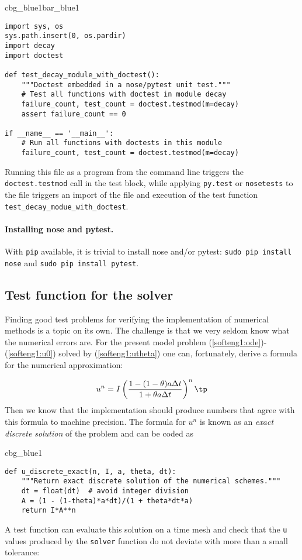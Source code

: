 \documentclass[graybox,sectrefs,envcountresetchap,open=right,final]{svmonodo}
\newenvironment{_cod_tight}[1]{
   \def\FrameCommand{\colorbox{#1}}
   \FrameRule0.6pt\MakeFramed {\FrameRestore}\vskip3mm}
   {\vskip0mm\endMakeFramed}
\newenvironment{cod}[1]{
\bgroup\rmfamily
\fboxsep=0mm\relax
\begin{_cod_tight}{#1}
\list{}{\parsep=-2mm\parskip=0mm\topsep=0pt\leftmargin=2mm
\rightmargin=2\leftmargin\leftmargin=4pt\relax}
\item\relax}
{\endlist\end{_cod_tight}\egroup}
\newenvironment{_pro_tight}[2]{
   \def\FrameCommand{\color{#2}\vrule width 1mm\normalcolor\colorbox{#1}}
   \FrameRule0.6pt\MakeFramed {\advance\hsize-2mm\FrameRestore}\vskip3mm}
   {\vskip0mm\endMakeFramed}
\newenvironment{pro}[2]{
\bgroup\rmfamily
\fboxsep=0mm\relax
\begin{_pro_tight}{#1}{#2}
\list{}{\parsep=-2mm\parskip=0mm\topsep=0pt\leftmargin=2mm
\rightmargin=2\leftmargin\leftmargin=4pt\relax}
\item\relax}
{\endlist\end{_pro_tight}\egroup}
\begin{document}
\begin{pro}{cbg_blue1}{bar_blue1}\begin{Verbatim}[numbers=none,fontsize=\fontsize{9pt}{9pt},baselinestretch=0.95,xleftmargin=2mm]
import sys, os
sys.path.insert(0, os.pardir)
import decay
import doctest

def test_decay_module_with_doctest():
    """Doctest embedded in a nose/pytest unit test."""
    # Test all functions with doctest in module decay
    failure_count, test_count = doctest.testmod(m=decay)
    assert failure_count == 0

if __name__ == '__main__':
    # Run all functions with doctests in this module
    failure_count, test_count = doctest.testmod(m=decay)
\end{Verbatim}
\end{pro}
\noindent
Running this file as a program from the command line
triggers the \texttt{doctest.testmod} call
in the test block, while applying \texttt{py.test} or \texttt{nosetests} to the file triggers
an import of the file and execution of the test function
\Verb!test_decay_modue_with_doctest!.

\paragraph{Installing nose and pytest.}
With \texttt{pip} available, it is trivial to install nose and/or pytest:
\texttt{sudo pip install nose} and \texttt{sudo pip install pytest}.

\subsection{Test function for the solver}

Finding good test problems for verifying the implementation of numerical
methods is a topic on its own. The challenge is that we very seldom know
what the numerical errors are. For the present model problem
(\ref{softeng1:ode})-(\ref{softeng1:u0}) solved by
(\ref{softeng1:utheta}) one can, fortunately, derive a formula for
the numerical approximation:

\[ u^n = I\left(
\frac{1 - (1-\theta) a\Delta t}{1 + \theta a \Delta t}
\right)^n\tp\]
Then we know that the implementation should
produce numbers that agree with this formula to machine precision.
The formula for $u^n$ is known as an \emph{exact discrete solution} of the
problem and can be coded as

\begin{cod}{cbg_blue1}\begin{Verbatim}[numbers=none,fontsize=\fontsize{9pt}{9pt},baselinestretch=0.95,xleftmargin=2mm]
def u_discrete_exact(n, I, a, theta, dt):
    """Return exact discrete solution of the numerical schemes."""
    dt = float(dt)  # avoid integer division
    A = (1 - (1-theta)*a*dt)/(1 + theta*dt*a)
    return I*A**n
\end{Verbatim}
\end{cod}
\noindent
A test function can evaluate this solution on a time mesh
and check that the \texttt{u} values produced by the \texttt{solver} function
do not deviate with more than a small tolerance:
\end{document}
